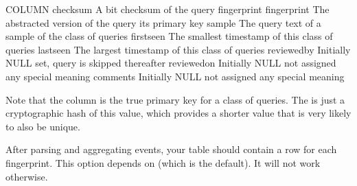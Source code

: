 \documentclass[letterpaper,10pt,english]{sphinxmanual}
\begin{document}
\begin{fulllineitems}
\begin{sphinxVerbatim}[commandchars=\\\{\}]
COLUMN       
  
checksum     A \PYGZhy{}bit checksum of the query fingerprint
fingerprint  The abstracted version of the query its primary key
sample       The query text of a sample of the class of queries
first\PYGZus{}seen   The smallest timestamp of this class of queries
last\PYGZus{}seen    The largest timestamp of this class of queries
reviewed\PYGZus{}by  Initially NULL  set, query is skipped thereafter
reviewed\PYGZus{}on  Initially NULL not assigned any special meaning
comments     Initially NULL not assigned any special meaning
\end{sphinxVerbatim}

Note that the  column is the true primary key for a class of
queries.  The  is just a cryptographic hash of this value, which
provides a shorter value that is very likely to also be unique.

After parsing and aggregating events, your table should contain a row for each
fingerprint.  This option depends on  (which is the
default).  It will not work otherwise.

\end{fulllineitems}

\end{document}
